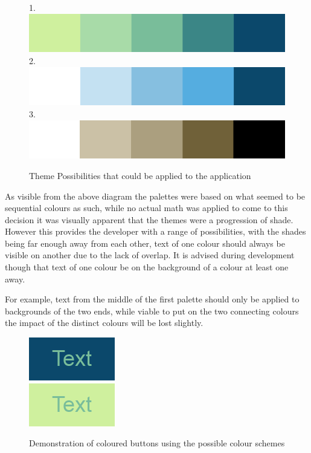 \begin{figure}[h]
1.
\includegraphics[scale=0.5]{Chapter2/colourone.png} \\

2.
\includegraphics[scale=0.5]{Chapter2/colourtwo.png} \\

3.
\includegraphics[scale=0.5]{Chapter2/colourthree.png}
\caption[Theme Possibilities]{Theme Possibilities that could be applied to the application}
\end{figure}
As visible from the above diagram the palettes were based on what seemed to be sequential colours as such, while no actual math was applied to come to this decision it was visually apparent that the themes were a progression of shade. However this provides the developer with a range of possibilities, with the shades being far enough away from each other, text of one colour should always be visible on another due to the lack of overlap. It is advised during development though that text of one colour be on the background of a colour at least one away. 

For example, text from the middle of the first palette should only be applied to backgrounds of the two ends, while viable to put on the two connecting colours the impact of the distinct colours will be lost slightly. 
\begin{figure}
\includegraphics[scale=0.5]{Chapter2/textone.png} \\

\vspace{0.2cm}
\includegraphics[scale=0.5]{Chapter2/texttwo.png} 
\caption[Button Examples]{Demonstration of coloured buttons using the possible colour schemes}
\end{figure}

